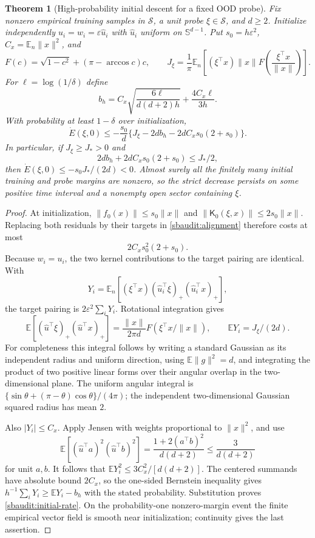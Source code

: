 \documentclass[11pt]{article}
\newtheorem{theorem}{Theorem}[section]
\theoremstyle{remark}
\begin{document}
\begin{theorem}[High-probability initial descent for a fixed OOD probe]
\label{sbaudit:initial-descent}
Fix nonzero empirical training samples in $\mathcal S$, a unit probe
$\xi\in\mathcal S$, and $d\ge2$. Initialize independently
$u_i=w_i=\varepsilon\widehat u_i$ with $\widehat u_i$ uniform on
$\mathbb S^{d-1}$. Put $s_0=h\varepsilon^2$,
$C_x=\mathbb E_n\|x\|^2$, and
\[
 F(c)=\sqrt{1-c^2}+(\pi-\arccos c)c,\qquad
 J_\xi=\frac1\pi\mathbb E_n\left[
 (\xi^\top x)\|x\| F\left(\frac{\xi^\top x}{\|x\|}\right)\right].
\]
For $\ell=\log(1/\delta)$ define
\[
 b_h=C_x\sqrt{\frac{6\ell}{d(d+2)h}}+
                 \frac{4C_x\ell}{3h}.
\]
With probability at least $1-\delta$ over initialization,
\begin{equation}\label{sbaudit:initial-rate}
 \dot E(\xi,0)\le-\frac{s_0}{d}
 \{J_\xi-2db_h-2dC_xs_0(2+s_0)\}.
\end{equation}
In particular, if $J_\xi\ge J_*>0$ and
\begin{equation}\label{sbaudit:initial-budget}
 2db_h+2dC_xs_0(2+s_0)\le J_*/2,
\end{equation}
then $\dot E(\xi,0)\le-s_0J_*/(2d)<0$. Almost surely all the finitely
many initial training and probe margins are nonzero, so the strict
decrease persists on some positive time interval and a nonempty open
sector containing $\xi$.
\end{theorem}
\begin{proof}
At initialization, $\|f_0(x)\|\le s_0\|x\|$ and
$\|\mathsf K_0(\xi,x)\|\le2s_0\|x\|$. Replacing both residuals by
their targets in \eqref{sbaudit:alignment} therefore costs at most
\[
 2C_xs_0^2(2+s_0).
\]
Because $w_i=u_i$, the two kernel contributions to the target pairing
are identical. With
\[
 Y_i=\mathbb E_n[(\xi^\top x)(\widehat u_i^\top\xi)_+
                                      (\widehat u_i^\top x)_+],
\]
the target pairing is $2\varepsilon^2\sum_iY_i$.
Rotational integration gives
\[
 \mathbb E[(\widehat u^\top\xi)_+(\widehat u^\top x)_+]
 =\frac{\|x\|}{2\pi d}F(\xi^\top x/\|x\|),
 \qquad \mathbb EY_i=J_\xi/(2d).
\]
For completeness this integral follows by writing a standard Gaussian
as its independent radius and uniform direction, using
$\mathbb E\|g\|^2=d$, and integrating the product of two positive
linear forms over their angular overlap in the two-dimensional plane.
The uniform angular integral is
$\{\sin\theta+(\pi-\theta)\cos\theta\}/(4\pi)$; the independent
two-dimensional Gaussian squared radius has mean $2$.

Also $|Y_i|\le C_x$. Apply Jensen with weights proportional to
$\|x\|^2$, and use
\[
 \mathbb E[(\widehat u^\top a)^2(\widehat u^\top b)^2]
 =\frac{1+2(a^\top b)^2}{d(d+2)}\le\frac3{d(d+2)}
\]
for unit $a,b$. It follows that
$\mathbb EY_i^2\le3C_x^2/[d(d+2)]$.
The centered summands have absolute bound $2C_x$, so the one-sided
Bernstein inequality gives $h^{-1}\sum_iY_i\ge\mathbb EY_i-b_h$
with the stated probability. Substitution proves
\eqref{sbaudit:initial-rate}. On the probability-one nonzero-margin
event the finite empirical vector field is smooth near initialization;
continuity gives the last assertion.
\end{proof}
\end{document}

